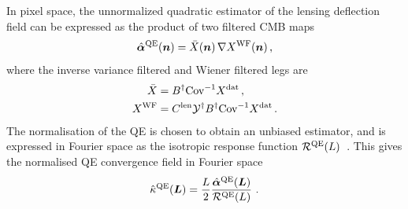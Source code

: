 \documentclass[prd, superscriptaddress, tightenlines, longbibliography, nofootinbib, eqsecnum, amsfonts, amsmath, floatfix, twocolumn, notitlepage]{revtex4-2}
\newcommand{\Cov}[0]{ {\rm{Cov}} }
\begin{document}
In pixel space, the unnormalized quadratic estimator of the lensing deflection field can be expressed as the product of two filtered CMB maps
\begin{equation}\label{Eq:QE}
    \hat {{\boldsymbol{\alpha}}}^{\rm QE}({\mbox{\boldmath{$n$}}}) = \bar X({\mbox{\boldmath{$n$}}}) \, \nabla X^{\rm WF}({\mbox{\boldmath{$n$}}}) \, ,
\end{equation}
where the inverse variance filtered and Wiener filtered legs are
\begin{equation}
    \begin{split}
        \bar X &= B^{\dagger} \Cov^{-1} X^{\rm dat} \, , \\
        X^{\rm WF} &= C^{\rm len}  \mathcal{Y}^\dagger B^{\dagger} \Cov^{-1} X^{\rm dat} \, .
    \end{split}
\end{equation}
The normalisation of the QE is chosen to obtain an unbiased estimator, and is expressed in Fourier space as the isotropic response function $\mathcal R^{\rm QE}(L)$~\cite{Hu:2001kj}.
This gives the normalised QE convergence field in Fourier space
\begin{equation}
    \hat \kappa^{\rm QE}({\mbox{\boldmath{$L$}}}) = \frac{L}{2} \frac{\hat {{\boldsymbol{\alpha}}}^{\rm QE}({\mbox{\boldmath{$L$}}})}{\mathcal R^{\rm QE}(L)} \,  \, .
\end{equation}
\end{document}
